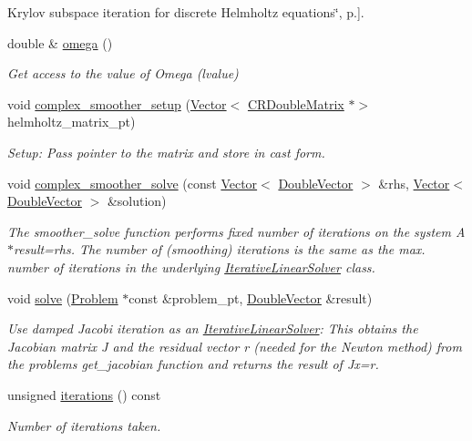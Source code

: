 \begin{DoxyCompactItemize}
\begin{DoxyCompactList}
\+Krylov subspace iteration for discrete Helmholtz equations\char`\"{}, p.\mbox{]}. \end{DoxyCompactList}\item 
double \& \hyperlink{classoomph_1_1ComplexDampedJacobi_a7132c319d14c6d3c6aac8ac0536af801}{omega} ()
\begin{DoxyCompactList}\small\item\em Get access to the value of Omega (lvalue) \end{DoxyCompactList}\item 
void \hyperlink{classoomph_1_1ComplexDampedJacobi_a9a322c00b8e352ad37db87a23a1ec6e3}{complex\+\_\+smoother\+\_\+setup} (\hyperlink{classoomph_1_1Vector}{Vector}$<$ \hyperlink{classoomph_1_1CRDoubleMatrix}{C\+R\+Double\+Matrix} $\ast$$>$ helmholtz\+\_\+matrix\+\_\+pt)
\begin{DoxyCompactList}\small\item\em Setup\+: Pass pointer to the matrix and store in cast form. \end{DoxyCompactList}\item 
void \hyperlink{classoomph_1_1ComplexDampedJacobi_a3e548db0f775e4239ff7b9c76a7b1c76}{complex\+\_\+smoother\+\_\+solve} (const \hyperlink{classoomph_1_1Vector}{Vector}$<$ \hyperlink{classoomph_1_1DoubleVector}{Double\+Vector} $>$ \&rhs, \hyperlink{classoomph_1_1Vector}{Vector}$<$ \hyperlink{classoomph_1_1DoubleVector}{Double\+Vector} $>$ \&solution)
\begin{DoxyCompactList}\small\item\em The smoother\+\_\+solve function performs fixed number of iterations on the system A$\ast$result=rhs. The number of (smoothing) iterations is the same as the max. number of iterations in the underlying \hyperlink{classoomph_1_1IterativeLinearSolver}{Iterative\+Linear\+Solver} class. \end{DoxyCompactList}\item 
void \hyperlink{classoomph_1_1ComplexDampedJacobi_ab9267bcbaf8435303190a1c12dbb7c2b}{solve} (\hyperlink{classoomph_1_1Problem}{Problem} $\ast$const \&problem\+\_\+pt, \hyperlink{classoomph_1_1DoubleVector}{Double\+Vector} \&result)
\begin{DoxyCompactList}\small\item\em Use damped Jacobi iteration as an \hyperlink{classoomph_1_1IterativeLinearSolver}{Iterative\+Linear\+Solver}\+: This obtains the Jacobian matrix J and the residual vector r (needed for the Newton method) from the problem\textquotesingle{}s get\+\_\+jacobian function and returns the result of Jx=r. \end{DoxyCompactList}\item 
unsigned \hyperlink{classoomph_1_1ComplexDampedJacobi_a34e565b3536b286b5544f5e30935b9e9}{iterations} () const
\begin{DoxyCompactList}\small\item\em Number of iterations taken. \end{DoxyCompactList}\end{DoxyCompactItemize}
